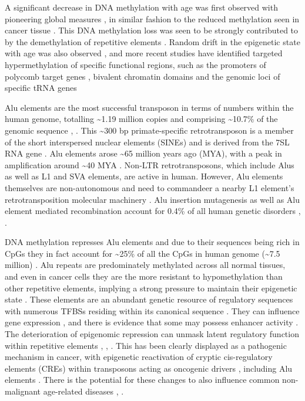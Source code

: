 \documentclass[
]{book}
\begin{document}
A significant decrease in DNA methylation with age was first observed with pioneering global measures \citep{Wilson1983}, in similar fashion to the reduced methylation seen in cancer tissue \citep{Gama-Sosa1983}.
This DNA methylation loss was seen to be strongly contributed to by the demethylation of repetitive elements \citep{Bollati2010}.
Random drift in the epigenetic state with age was also observed \citep{Bollati2010}, and more recent studies have identified targeted hypermethylation of specific functional regions, such as the promoters of polycomb target genes \citep{Teschendorff2010}, bivalent chromatin domains \citep{Rakyan2010} and the genomic loci of specific tRNA genes \citep{Acton2020}

Alu elements are the most successful transposon in terms of numbers within the human genome, totalling \textasciitilde1.19 million copies and comprising \textasciitilde10.7\% of the genomic sequence \citep{Dewannieux2003}, \citep{Deininger2011}.
This \textasciitilde300 bp primate-specific retrotransposon is a member of the short interspersed nuclear elements (SINEs) and is derived from the 7SL RNA gene \citep{Ullu1984}.
Alu elements arose \textasciitilde65 million years ago (MYA), with a peak in amplification around \textasciitilde40 MYA \citep{Ade2013}.
Non-LTR retrotransposons, which include Alus as well as L1 and SVA elements, are active in human.
However, Alu elements themselves are non-autonomous and need to commandeer a nearby L1 element's retrotransposition molecular machinery \citep{Cordaux2009}.
Alu insertion mutagenesis as well as Alu element mediated recombination account for 0.4\% of all human genetic disorders \citep{Kazazian2017}, \citep{Belancio2008}.

DNA methylation represses Alu elements and due to their sequences being rich in CpGs they in fact account for \textasciitilde25\% of all the CpGs in human genome (\textasciitilde7.5 million) \citep{Deininger2011}.
Alu repeats are predominately methylated across all normal tissues, and even in cancer cells they are the more resistant to hypomethylation than other repetitive elements, implying a strong pressure to maintain their epigenetic state \citep{Jorda2017}.
These elements are an abundant genetic resource of regulatory sequences with
numerous TFBSs residing within its canonical sequence \citep{Polak2006}.
They can influence gene expression \citep{Chen2017b}, \citep{RobertoFerrari2019} and there is evidence that some may possess enhancer activity \citep{Su2014}.
The deterioration of epigenomic repression can unmask latent regulatory function within repetitive elements \citep{Ward2013}, \citep{Chuong2017}, \citep{Xie2013}.
This has been clearly displayed as a pathogenic mechanism in cancer, with epigenetic reactivation of cryptic cis-regulatory elements (CREs) within transposons acting as oncogenic drivers \citep{Jang2019} , including Alu elements \citep{Rajendiran2016}.
There is the potential for these changes to also influence common non-malignant age-related diseases \citep{Chuong2017}, \citep{Payer2017}.
\end{document}
